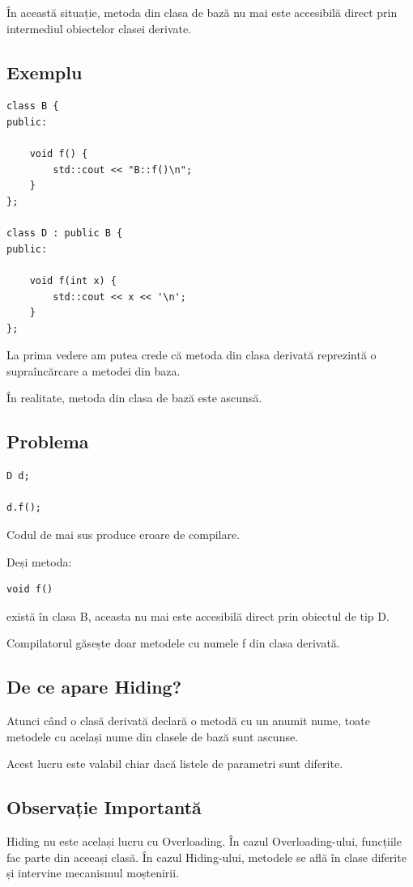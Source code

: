 \documentclass[12pt,a4paper]{article}
\begin{document}
În această situație, metoda din clasa de bază nu mai este accesibilă direct prin intermediul obiectelor clasei derivate.

\subsection{Exemplu}

\begin{verbatim}
class B {
public:

    void f() {
        std::cout << "B::f()\n";
    }
};

class D : public B {
public:

    void f(int x) {
        std::cout << x << '\n';
    }
};
\end{verbatim}

La prima vedere am putea crede că metoda din clasa derivată reprezintă o supraîncărcare a metodei din baza.

În realitate, metoda din clasa de bază este ascunsă.

\subsection{Problema}

\begin{verbatim}
D d;

d.f();
\end{verbatim}

Codul de mai sus produce eroare de compilare.

Deși metoda:

\begin{verbatim}
void f()
\end{verbatim}

există în clasa B, aceasta nu mai este accesibilă direct prin obiectul de tip D.

Compilatorul găsește doar metodele cu numele f din clasa derivată.

\subsection{De ce apare Hiding?}

Atunci când o clasă derivată declară o metodă cu un anumit nume, toate metodele cu același nume din clasele de bază sunt ascunse.

Acest lucru este valabil chiar dacă listele de parametri sunt diferite.

\subsection{Observație Importantă}
Hiding nu este același lucru cu Overloading.
În cazul Overloading-ului, funcțiile fac parte din aceeași clasă.
În cazul Hiding-ului, metodele se află în clase diferite și intervine mecanismul moștenirii.
\end{document}
